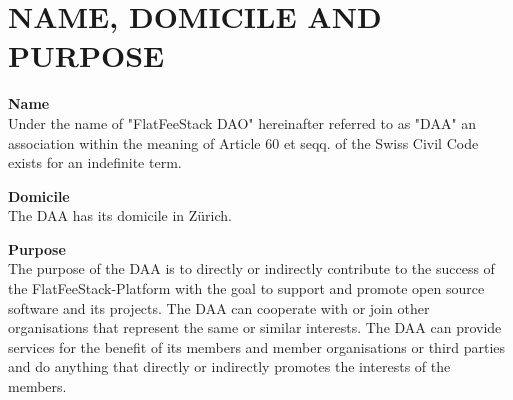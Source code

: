 \section{NAME, DOMICILE AND PURPOSE}\label{sec:name-domicile-and-purpose}

\item \textbf{Name} \\
Under the name of "FlatFeeStack DAO" hereinafter referred to as "DAA" an association within the meaning of Article 60 et seqq. of the Swiss Civil Code exists for an indefinite term.

\item \textbf{Domicile} \\
The DAA has its domicile in Zürich.

\item \textbf{Purpose} \\
The purpose of the DAA is to directly or indirectly contribute to the success of the FlatFeeStack-Platform with the goal to support and promote open source software and its projects.
The DAA can cooperate with or join other organisations that represent the same or similar interests.
The DAA can provide services for the benefit of its members and member organisations or third parties and do anything that directly or indirectly promotes the interests of the members.
